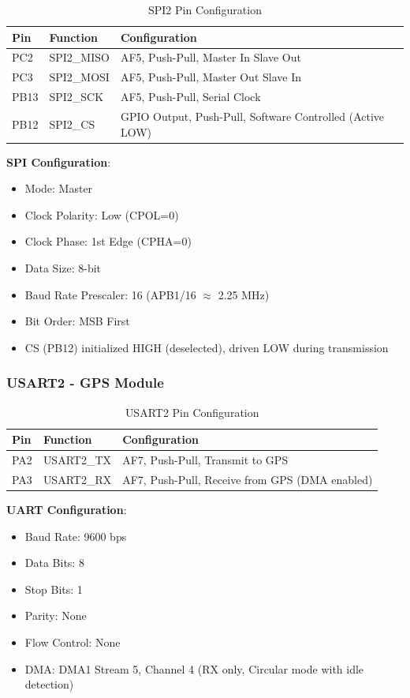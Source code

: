 \documentclass[11pt,a4paper]{article}
\begin{document}
\begin{table}[H]
\centering
\begin{tabular}{@{}llp{8cm}@{}}
\toprule
\textbf{Pin} & \textbf{Function} & \textbf{Configuration} \\
\midrule
PC2 & SPI2\_MISO & AF5, Push-Pull, Master In Slave Out \\
PC3 & SPI2\_MOSI & AF5, Push-Pull, Master Out Slave In \\
PB13 & SPI2\_SCK & AF5, Push-Pull, Serial Clock \\
PB12 & SPI2\_CS & GPIO Output, Push-Pull, Software Controlled (Active LOW) \\
\bottomrule
\end{tabular}
\caption{SPI2 Pin Configuration}
\end{table}

\textbf{SPI Configuration}:
\begin{itemize}
    \item Mode: Master
    \item Clock Polarity: Low (CPOL=0)
    \item Clock Phase: 1st Edge (CPHA=0)
    \item Data Size: 8-bit
    \item Baud Rate Prescaler: 16 (APB1/16 $\approx$ 2.25 MHz)
    \item Bit Order: MSB First
    \item CS (PB12) initialized HIGH (deselected), driven LOW during transmission
\end{itemize}

\subsubsection{USART2 - GPS Module}

\begin{table}[H]
\centering
\begin{tabular}{@{}llp{8cm}@{}}
\toprule
\textbf{Pin} & \textbf{Function} & \textbf{Configuration} \\
\midrule
PA2 & USART2\_TX & AF7, Push-Pull, Transmit to GPS \\
PA3 & USART2\_RX & AF7, Push-Pull, Receive from GPS (DMA enabled) \\
\bottomrule
\end{tabular}
\caption{USART2 Pin Configuration}
\end{table}

\textbf{UART Configuration}:
\begin{itemize}
    \item Baud Rate: 9600 bps
    \item Data Bits: 8
    \item Stop Bits: 1
    \item Parity: None
    \item Flow Control: None
    \item DMA: DMA1 Stream 5, Channel 4 (RX only, Circular mode with idle detection)
\end{itemize}
\end{document}
